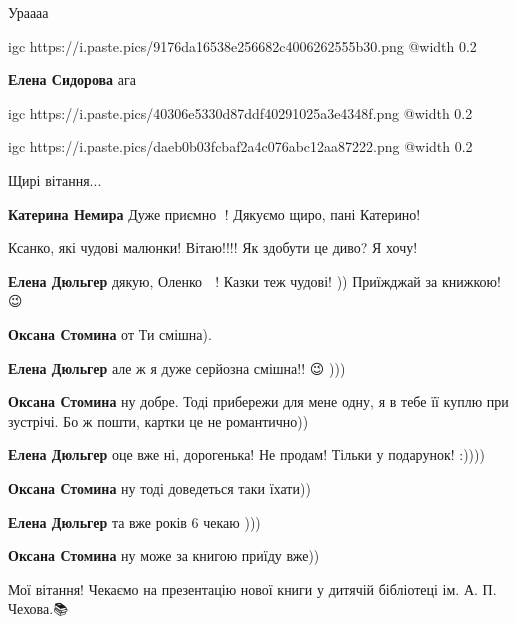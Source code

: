 
Ураааа

\ifcmt
  igc https://i.paste.pics/9176da16538e256682c4006262555b30.png
	@width 0.2
\fi

\begin{itemize} %
\textbf{Елена Сидорова} ага 🙂
\end{itemize} %


\ifcmt
  igc https://i.paste.pics/40306e5330d87ddf40291025a3e4348f.png
	@width 0.2
\fi


\ifcmt
  igc https://i.paste.pics/daeb0b03fcbaf2a4c076abc12aa87222.png
	@width 0.2
\fi


Щирі вітання...

\textbf{Катерина Немира} Дуже приємно 🙂! Дякуємо щиро, пані Катерино!


Ксанко, які чудові малюнки! Вітаю!!!! Як здобути це диво? Я хочу!

\begin{itemize} %
\textbf{Елена Дюльгер} дякую, Оленко 🙂 ! Казки теж чудові! )) Приїжджай за книжкою! 😉 🙂

\textbf{Оксана Стомина} от Ти смішна).

\textbf{Елена Дюльгер} але ж я дуже серйозна смішна!! 😉 )))

\textbf{Оксана Стомина} ну добре. Тоді прибережи для мене одну, я в тебе її куплю при зустрічі. Бо ж пошти, картки це не романтично))

\textbf{Елена Дюльгер} оце вже ні, дорогенька! Не продам! Тільки у подарунок! :))))

\textbf{Оксана Стомина} ну тоді доведеться таки їхати))

\textbf{Елена Дюльгер} та вже років 6 чекаю )))

\textbf{Оксана Стомина} ну може за книгою приїду вже))

\end{itemize} %


Мої вітання! Чекаємо на презентацію нової книги у дитячій бібліотеці ім. А. П.
Чехова.📚

